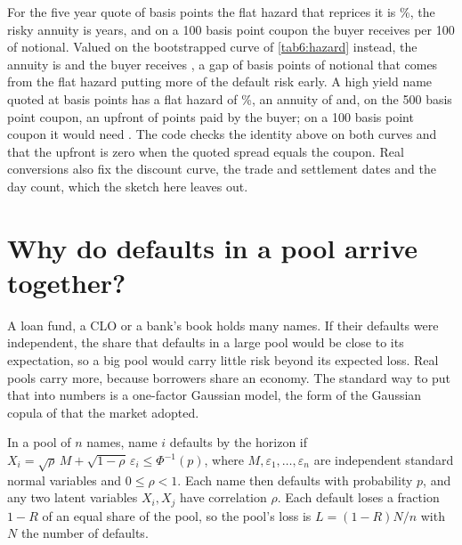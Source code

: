 \begin{chapterrefs}
For the five year quote of \hzQFive{} basis points the flat hazard that reprices it is \cdFlatLam\%, the
risky annuity is \cdAnnFlat{} years, and on a 100 basis point coupon the buyer receives \cdUpIg{} per
100 of notional. Valued on the bootstrapped curve of \cref{tab6:hazard} instead, the annuity is
\cdAnnCurve{} and the buyer receives \cdUpIgCurve, a gap of \cdUpIgGapBp{} basis points of notional
that comes from the flat hazard putting more of the default risk early. A high yield name quoted at
\cdQHy{} basis points has a flat hazard of \cdLamHy\%, an annuity of \cdAnnHy{} and, on the 500 basis
point coupon, an upfront of \cdUpHy{} points paid by the buyer; on a 100 basis point coupon it would
need \cdUpHyOne. The code checks the identity above on both curves and that the upfront is zero
when the quoted spread equals the coupon. Real conversions also fix the discount curve, the trade and
settlement dates and the day count, which the sketch here leaves out.

\section{Why do defaults in a pool arrive together?}
\label{sec6:copula}

A loan fund, a CLO or a bank's book holds many names. If their defaults were independent, the share
that defaults in a large pool would be close to its expectation, so a big pool would carry little risk beyond its expected loss.
Real pools carry more, because borrowers share an economy. The standard way to put that into numbers is a
one-factor Gaussian model, the form of the Gaussian copula of \textcite{li2000} that the market adopted.

\begin{definition}\label{def6:copula}
In a pool of $n$ names, name $i$ defaults by the horizon if
$X_i=\sqrt\rho\,M+\sqrt{1-\rho}\,\varepsilon_i\le\Phi^{-1}(p)$, where $M,\varepsilon_1,\dots,\varepsilon_n$
are independent standard normal variables and $0\le\rho<1$. Each name then defaults with
probability $p$, and any two latent variables $X_i,X_j$ have correlation $\rho$. Each default loses a
fraction $1-R$ of an equal share of the pool, so the pool's loss is $L=(1-R)N/n$ with $N$ the number
of defaults.
\end{definition}


\end{chapterrefs}
